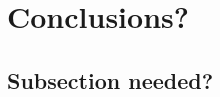 

\section{Conclusions?}\label{sec:conclusion}                                                   %

\subsection{Subsection needed?}\label{XXXXXXXXXXXXXXXXXXXXXXXX}       %

